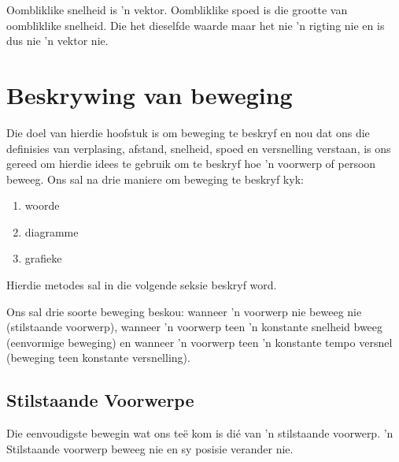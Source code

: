 Oombliklike snelheid is  'n vektor. Oombliklike spoed is die grootte van oombliklike snelheid. Die het dieselfde waarde maar het nie  'n rigting nie en is dus nie  'n vektor nie.


\section{Beskrywing van beweging}

Die doel van hierdie hoofstuk is om beweging te beskryf en nou dat ons die definisies van verplasing, afstand, snelheid, spoed en versnelling verstaan, is ons gereed om hierdie idees te gebruik om te beskryf hoe  'n voorwerp of persoon beweeg. Ons sal na drie maniere  om beweging te beskryf kyk:\par 
\begin{enumerate}[noitemsep, label=\textbf{\arabic*}. ] 
    \item woorde
    \item diagramme
    \item grafieke
\end{enumerate}
Hierdie metodes sal in die volgende seksie beskryf word. \par 
Ons sal drie soorte beweging beskou: wanneer  'n voorwerp nie beweeg nie (stilstaande voorwerp), wanneer  'n voorwerp teen  'n konstante snelheid bweeg (eenvormige beweging) en wanneer  'n voorwerp teen  'n konstante tempo versnel (beweging teen konstante versnelling).\par 

\subsection*{Stilstaande Voorwerpe}
\nopagebreak
Die eenvoudigste bewegin wat ons te\"e kom is di\'e van  'n stilstaande voorwerp.  'n Stilstaande voorwerp beweeg nie en sy posisie verander nie.

